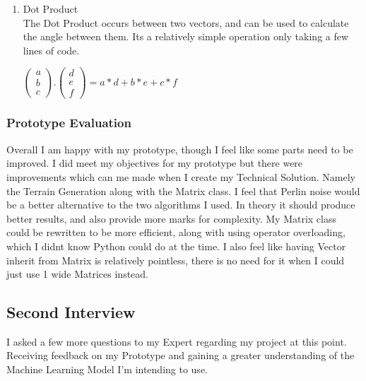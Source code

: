 \begin{flushleft}
\begin{enumerate}
                    \item Dot Product \\
                        The Dot Product occurs between two vectors, and can be used to calculate the angle between them. 
                        Its a relatively simple operation only taking a few lines of code.
                        \begin{center}
                            $
                            \begin{pmatrix}
                                a \\
                                b \\
                                c
                            \end{pmatrix} .
                            \begin{pmatrix}
                                d \\
                                e \\
                                f
                            \end{pmatrix} = 
                            a*d + b*e + c*f$
                        \end{center}
                \end{enumerate}
                \vspace{1cm}
            \subsubsection{Prototype Evaluation}
                \vspace{0.2cm}
                Overall I am happy with my prototype, though I feel like some parts need to be improved. I did meet my 
                objectives for my prototype but there were improvements which can me made when I create my Technical Solution. 
                Namely the Terrain Generation along with the Matrix class. I feel that Perlin noise would be a better alternative
                to the two algorithms I used. In theory it should produce better results, and also provide more marks for 
                complexity. My Matrix class could be rewritten to be more efficient, along with using operator overloading, which
                I didnt know Python could do at the time. I also feel like having Vector inherit from Matrix is relatively pointless,
                there is no need for it when I could just use 1 wide Matrices instead.
        \subsection{Second Interview}
            \vspace{0.2cm}
            I asked a few more questions to my Expert regarding my project at this point. Receiving feedback on my Prototype and gaining a
            greater understanding of the Machine Learning Model I'm intending to use. \\
            \vspace{0.2cm}


\end{flushleft}
